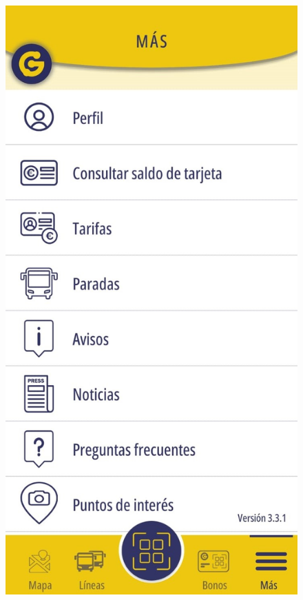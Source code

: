 \documentclass[a4paper,12pt]{article}
\begin{document}
\begin{figure}[htbp]
    \centering
    \begin{minipage}{0.5\textwidth}
        \includegraphics[width=\linewidth]{Images/seccion_mas.jpg}
    \end{minipage}%
    \hspace{0.8cm}
    \begin{minipage}{0.3\textwidth}
        

\end{minipage}
\end{figure}
\end{document}
